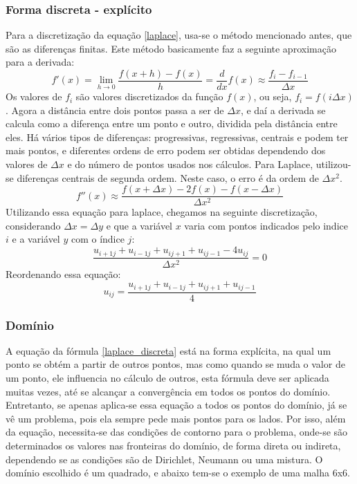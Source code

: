 \documentclass[journal]{IEEEtran}
\begin{document}
\subsubsection{Forma discreta - explícito}
Para a discretização da equação \ref{laplace}, usa-se o método mencionado antes, que são as diferenças finitas. Este método basicamente faz a seguinte aproximação para a derivada:
\begin{equation}
f'(x)=\lim_{h\rightarrow 0}\frac{f(x+h)-f(x)}{h}=\frac{d}{dx}f(x)\approx \frac{f_i-f_{i-1}}{\Delta x}
\end{equation}
Os valores de $f_i$ são valores discretizados da função $f(x)$, ou seja, $f_i=f(i\Delta x)$. Agora a distância entre dois pontos passa a ser de $\Delta x$, e daí a derivada se calcula como a diferença entre um ponto e outro, dividida pela distância entre eles. Há vários tipos de diferenças: progressivas, regressivas, centrais e podem ter mais pontos, e diferentes ordens de erro podem ser obtidas dependendo dos valores de $\Delta x$ e do número de pontos usados nos cálculos. Para Laplace, utilizou-se diferenças centrais de segunda ordem. Neste caso, o erro é da ordem de $\Delta x^2$.
\begin{equation}
f''(x)\approx \frac{f(x+\Delta x)-2f(x)-f(x-\Delta x)}{\Delta x^2}
\end{equation}
Utilizando essa equação para laplace, chegamos na seguinte discretização, considerando $\Delta x=\Delta y$ e que a variável $x$ varia com pontos indicados pelo indice $i$ e a variável $y$ com o índice $j$:
\begin{equation}
\frac{u_{i+1j}+u_{i-1j}+u_{ij+1}+u_{ij-1}-4u_{ij}}{\Delta x^2}=0
\end{equation}
Reordenando essa equação:
\begin{equation}
  u_{ij}=\frac{u_{i+1j}+u_{i-1j}+u_{ij+1}+u_{ij-1}}{4} \label{laplace_discreta}
\end{equation}
\subsubsection{Domínio}
A equação da fórmula \ref{laplace_discreta} está na forma explícita, na qual um ponto se obtém a partir de outros pontos, mas como quando se muda o valor de um ponto, ele influencia no cálculo de outros, esta fórmula deve ser aplicada muitas vezes, até se alcançar a convergência em todos os pontos do domínio. Entretanto, se apenas aplica-se essa equação a todos os pontos do domínio, já se vê um problema, pois ela sempre pede mais pontos para os lados. Por isso, além da equação, necessita-se das condições de contorno para o problema, onde-se são determinados os valores nas fronteiras do domínio, de forma direta ou indireta, dependendo se as condições são de Dirichlet, Neumann ou uma mistura. O domínio escolhido é um quadrado, e abaixo tem-se o exemplo de uma malha 6x6.
\end{document}
